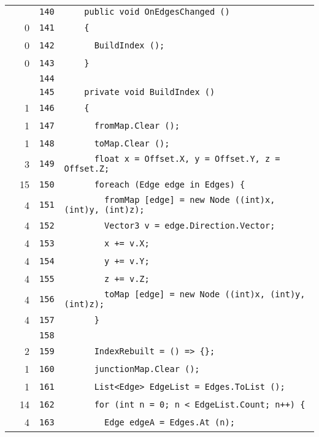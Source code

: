 \documentclass[a4paper,10pt]{article}
\begin{document}
\begin{longtable}[l]{lrrl}
\cellcolor{gray} &  & \verb~140~ & \verb~    public void OnEdgesChanged ()~\\
\cellcolor{red} & 0 & \verb~141~ & \verb~    {~\\
\cellcolor{red} & 0 & \verb~142~ & \verb~      BuildIndex ();~\\
\cellcolor{red} & 0 & \verb~143~ & \verb~    }~\\
\cellcolor{gray} &  & \verb~144~ & \verb~~\\
\cellcolor{gray} &  & \verb~145~ & \verb~    private void BuildIndex ()~\\
\cellcolor{green} & 1 & \verb~146~ & \verb~    {~\\
\cellcolor{green} & 1 & \verb~147~ & \verb~      fromMap.Clear ();~\\
\cellcolor{green} & 1 & \verb~148~ & \verb~      toMap.Clear ();~\\
\cellcolor{green} & 3 & \verb~149~ & \verb~      float x = Offset.X, y = Offset.Y, z = Offset.Z;~\\
\cellcolor{green} & 15 & \verb~150~ & \verb~      foreach (Edge edge in Edges) {~\\
\cellcolor{green} & 4 & \verb~151~ & \verb~        fromMap [edge] = new Node ((int)x, (int)y, (int)z);~\\
\cellcolor{green} & 4 & \verb~152~ & \verb~        Vector3 v = edge.Direction.Vector;~\\
\cellcolor{green} & 4 & \verb~153~ & \verb~        x += v.X;~\\
\cellcolor{green} & 4 & \verb~154~ & \verb~        y += v.Y;~\\
\cellcolor{green} & 4 & \verb~155~ & \verb~        z += v.Z;~\\
\cellcolor{green} & 4 & \verb~156~ & \verb~        toMap [edge] = new Node ((int)x, (int)y, (int)z);~\\
\cellcolor{green} & 4 & \verb~157~ & \verb~      }~\\
\cellcolor{gray} &  & \verb~158~ & \verb~~\\
\cellcolor{green} & 2 & \verb~159~ & \verb~      IndexRebuilt = () => {};~\\
\cellcolor{green} & 1 & \verb~160~ & \verb~      junctionMap.Clear ();~\\
\cellcolor{green} & 1 & \verb~161~ & \verb~      List<Edge> EdgeList = Edges.ToList ();~\\
\cellcolor{green} & 14 & \verb~162~ & \verb~      for (int n = 0; n < EdgeList.Count; n++) {~\\
\cellcolor{green} & 4 & \verb~163~ & \verb~        Edge edgeA = Edges.At (n);~\\

\end{longtable}
\end{document}
